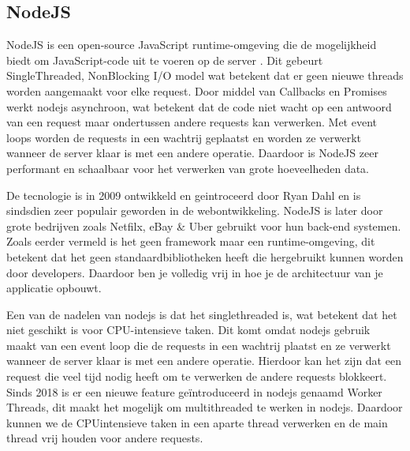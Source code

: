 \subsection{NodeJS}
NodeJS is een open-source JavaScript runtime-omgeving die de mogelijkheid biedt om JavaScript-code uit te voeren op de server \autocite{NodeJS2022}.
Dit gebeurt Single\-Threaded, Non\-Blocking I/O model wat betekent dat er geen nieuwe threads worden aangemaakt voor elke request.
Door middel van Callbacks en Promises werkt nodejs asynchroon, wat betekent dat de code niet wacht op een antwoord van een request maar ondertussen andere requests kan verwerken.
Met event loops worden de requests in een wachtrij geplaatst en worden ze verwerkt wanneer de server klaar is met een andere operatie.
Daardoor is NodeJS zeer performant en schaalbaar voor het verwerken van grote hoeveelheden data.

De tecnologie is in 2009 ontwikkeld en geintroceerd door Ryan Dahl en is sindsdien zeer populair geworden in de webontwikkeling. 
NodeJS is later door grote bedrijven zoals Netfilx, eBay \& Uber gebruikt voor hun back-end systemen.
Zoals eerder vermeld is het geen framework maar een runtime-omgeving, dit betekent dat het geen standaardbibliotheken heeft die hergebruikt kunnen worden door developers.
Daardoor ben je volledig vrij in hoe je de architectuur van je applicatie opbouwt.

Een van de nadelen van nodejs is dat het single\-threaded is, wat betekent dat het niet geschikt is voor CPU-intensieve taken.
Dit komt omdat nodejs gebruik maakt van een event loop die de requests in een wachtrij plaatst en ze verwerkt wanneer de server klaar is met een andere operatie.
Hierdoor kan het zijn dat een request die veel tijd nodig heeft om te verwerken de andere requests blokkeert.
Sinds 2018 is er een nieuwe feature geïntroduceerd in nodejs genaamd Worker Threads, dit maakt het mogelijk om multi\-threaded te werken in nodejs.
Daardoor kunnen we de CPU\-intensieve taken in een aparte thread verwerken en de main thread vrij houden voor andere requests.

